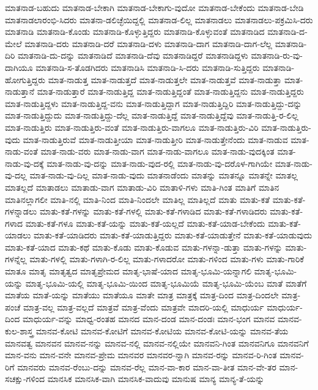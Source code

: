 {ಮಾತನಾಡ-ಬಹುದು
ಮಾತನಾಡ-ಬೇಕಾಗಿ
ಮಾತನಾಡ-ಬೇಕಾಗು-ವುದೋ
ಮಾತನಾಡ-ಬೇಕೆಂದು
ಮಾತನಾಡ-ಬೇಡಿ
ಮಾತನಾಡಲಾರಂಭಿ-ಸಿದರು
ಮಾತನಾ-ಡಲಿಚ್ಛೆಯಿದ್ದಲ್ಲಿ
ಮಾತನಾಡ-ಲಿಲ್ಲ
ಮಾತನಾಡಲು
ಮಾತನಾಡಲು-ಪಕ್ರಮಿಸಿ-ದರು
ಮಾತನಾಡಿ
ಮಾತನಾಡಿ-ಕೊಂಡು
ಮಾತನಾಡಿ-ಕೊಳ್ಳುತ್ತಿದ್ದರು
ಮಾತನಾಡಿ-ಕೊಳ್ಳುವಂತೆ
ಮಾತನಾಡಿದ
ಮಾತನಾಡಿ-ದ-ಮೇಲೆ
ಮಾತನಾಡಿ-ದರು
ಮಾತನಾಡಿ-ದರೆ
ಮಾತನಾಡಿ-ದಳು
ಮಾತನಾಡಿ-ದಾಗ
ಮಾತನಾಡಿ-ದಾಗ-ಲೆಲ್ಲ
ಮಾತನಾಡಿ-ದಿರಿ
ಮಾತನಾಡಿ-ದು-ದನ್ನು
ಮಾತನಾಡಿದೆ
ಮಾತನಾಡಿ-ದೆವು
ಮಾತನಾಡಿದ್ದರೆ
ಮಾತನಾಡಿದ್ದಳು
ಮಾತನಾಡಿ-ರು-ವು-ದಾಗಿಯೂ
ಮಾತನಾಡಿ-ಸ-ತೊಡಗಿದರು
ಮಾತನಾಡಿಸಿ
ಮಾತನಾಡಿ-ಸಿ-ದರು
ಮಾತನಾಡಿ-ಸುತ್ತಿದ್ದರು
ಮಾತನಾಡಿ-ಹೋಗುತ್ತಿದ್ದರು
ಮಾತ-ನಾಡುತ್ತ
ಮಾತ-ನಾಡುತ್ತದೆ
ಮಾತ-ನಾಡುತ್ತಲೇ
ಮಾತ-ನಾಡುತ್ತವೆ
ಮಾತ-ನಾಡುತ್ತಾ
ಮಾತ-ನಾಡುತ್ತಾನೆ
ಮಾತ-ನಾಡುತ್ತಾರೆ
ಮಾತ-ನಾಡುತ್ತಿದ್ದ
ಮಾತ-ನಾಡುತ್ತಿದ್ದಂತೆ
ಮಾತ-ನಾಡುತ್ತಿದ್ದನು
ಮಾತ-ನಾಡುತ್ತಿದ್ದರು
ಮಾತ-ನಾಡುತ್ತಿದ್ದಳು
ಮಾತ-ನಾಡುತ್ತಿದ್ದ-ವನು
ಮಾತ-ನಾಡುತ್ತಿದ್ದಾಗ
ಮಾತ-ನಾಡುತ್ತಿದ್ದಿರಿ
ಮಾತ-ನಾಡುತ್ತಿದ್ದು-ದನ್ನು
ಮಾತ-ನಾಡುತ್ತಿದ್ದುದು
ಮಾತ-ನಾಡುತ್ತಿದ್ದು-ದೆಲ್ಲ
ಮಾತ-ನಾಡುತ್ತಿದ್ದೆ
ಮಾತ-ನಾಡುತ್ತಿದ್ದೆವು
ಮಾತ-ನಾಡುತ್ತಿ-ರ-ಲಿಲ್ಲ
ಮಾತ-ನಾಡುತ್ತಿರು
ಮಾತ-ನಾಡುತ್ತಿರು-ವಂತೆ
ಮಾತ-ನಾಡುತ್ತಿರು-ವಾಗಲೂ
ಮಾತ-ನಾಡುತ್ತಿರು-ವಿರಿ
ಮಾತ-ನಾಡುತ್ತಿರು-ವುದು
ಮಾತ-ನಾಡುತ್ತಿರುವೆ
ಮಾತ-ನಾಡುತ್ತೀಯಾ
ಮಾತ-ನಾಡುತ್ತೀರಿ
ಮಾತ-ನಾಡುತ್ತೇನೆಂದು
ಮಾತ-ನಾಡುವ
ಮಾತ-ನಾಡು-ವಂತೆ
ಮಾತ-ನಾಡು-ವರು
ಮಾತ-ನಾಡು-ವಾಗ
ಮಾತ-ನಾಡು-ವಾಗಲೂ
ಮಾತ-ನಾಡು-ವುದಕ್ಕಿಂತ
ಮಾತ-ನಾಡು-ವು-ದಕ್ಕೆ
ಮಾತ-ನಾಡು-ವು-ದನ್ನು
ಮಾತ-ನಾಡು-ವುದ-ರಲ್ಲಿ
ಮಾತ-ನಾಡು-ವು-ದರೊಳ-ಗಾಗಿಯೇ
ಮಾತ-ನಾಡು-ವು-ದಲ್ಲ
ಮಾತ-ನಾಡು-ವು-ದಿಲ್ಲ
ಮಾತ-ನಾಡು-ವುದು
ಮಾತನಾಡೆಂದು
ಮಾತನ್ನು
ಮಾತನ್ನೂ
ಮಾತನ್ನೇ
ಮಾತಲ್ಲ
ಮಾತಲ್ಲದೆ
ಮಾತಾಡಲು
ಮಾತಾಡು-ವಾಗ
ಮಾತಾಡು-ವಿರಿ
ಮಾತಾಳಿ-ಗಳು
ಮಾತಿ-ಗಿಂತ
ಮಾತಿಗೆ
ಮಾತಿನ
ಮಾತಿನಲ್ಲಾಗಲೀ
ಮಾತಿ-ನಲ್ಲಿ
ಮಾತಿ-ನಿಂದ
ಮಾತಿ-ನಿಂದಲೇ
ಮಾತಿಲ್ಲ
ಮಾತಿಲ್ಲದೆ
ಮಾತು
ಮಾತು-ಕತೆ
ಮಾತು-ಕತೆ-ಗಳನ್ನಾಡಲು
ಮಾತು-ಕತೆ-ಗಳನ್ನು
ಮಾತು-ಕತೆ-ಗಳಲ್ಲಿ
ಮಾತು-ಕತೆ-ಗಳಾಡಿದ
ಮಾತು-ಕತೆ-ಗಳಾಡಿದರು
ಮಾತು-ಕತೆ-ಗಳಾದ
ಮಾತು-ಕತೆ-ಗಳೂ
ಮಾತು-ಕತೆ-ಯನ್ನು
ಮಾತು-ಕತೆ-ಯಲ್ಲದೆ
ಮಾತು-ಕತೆ-ಯಾಡ-ಬೇಕೆಂದು
ಮಾತು-ಕತೆ-ಯಾಡಲು
ಮಾತು-ಕತೆ-ಯಾಡಿದರು
ಮಾತು-ಕತೆ-ಯಾಡುತ್ತಿದ್ದರು
ಮಾತು-ಕತೆ-ಯಾಡುತ್ತೇನೆ
ಮಾತು-ಕತೆ-ಯಾಡುವುದು
ಮಾತು-ಕತೆ-ಯಾದ
ಮಾತು-ಕಥೆ
ಮಾತು-ಕೊಡು
ಮಾತು-ಕೊಡುವ
ಮಾತು-ಗಳನ್ನಾ-ಡುತ್ತಾ
ಮಾತು-ಗಳನ್ನು
ಮಾತು-ಗಳನ್ನೆಲ್ಲ
ಮಾತು-ಗಳಲ್ಲಿ
ಮಾತು-ಗಳಾಗಿ-ರ-ಲಿಲ್ಲ
ಮಾತು-ಗಳಾದರೋ
ಮಾತು-ಗಳಿಂದ
ಮಾತು-ಗಳು
ಮಾತು-ಗಾರಿಕೆ
ಮಾತೂ
ಮಾತೃ
ಮಾತೃತ್ವದ
ಮಾತೃಪ್ರೇಮದ
ಮಾತೃ-ಭಾಷೆ-ಯಾದ
ಮಾತೃ-ಭೂಮಿ-ಯನ್ನಾಗಲಿ
ಮಾತೃ-ಭೂಮಿ-ಯನ್ನು
ಮಾತೃ-ಭೂಮಿ-ಯಲ್ಲಿ
ಮಾತೃ-ಭೂಮಿ-ಯಿಂದ
ಮಾತೃ-ಭೂಮಿಯೆ
ಮಾತೃ-ಭೂಮಿ-ಯೆಂಬ
ಮಾತೆ
ಮಾತೆಗೆ
ಮಾತೆಯ
ಮಾತೆ-ಯನ್ನು
ಮಾತೆಯು
ಮಾತೆಯೂ
ಮಾತೇ
ಮಾತ್ರ
ಮಾತ್ರಕ್ಕೆ
ಮಾತ್ರ-ದಿಂದ
ಮಾತ್ರ-ದಿಂದಲೇ
ಮಾತ್ರ-ಪಂಚೆ
ಮಾತ್ರ-ವಲ್ಲ
ಮಾತ್ರ-ವಲ್ಲದೆ
ಮಾತ್ರವೆ
ಮಾತ್ರ-ವೆಂದು
ಮಾತ್ರವೇ
ಮಾದರಿ-ಯಲ್ಲಿ
ಮಾಧುರ್ಯ
ಮಾಧುರ್ಯ-ದಿಂದ
ಮಾಧುರ್ಯ-ವನ್ನು
ಮಾಧ್ವ-ರಂತಹ
ಮಾನದ
ಮಾನ-ದಂಡ
ಮಾನ-ದಂಡಃ
ಮಾನ-ಭಂಗ
ಮಾನವ
ಮಾನವ-ಕುಲ-ಶಾಸ್ತ್ರ
ಮಾನವ-ಕೋಟಿ
ಮಾನವ-ಕೋಟಿಗೆ
ಮಾನವ-ಕೋಟಿಯ
ಮಾನವ-ಕೋಟಿ-ಯನ್ನು
ಮಾನವ-ತೆಯ
ಮಾನವತ್ವ
ಮಾನವನ
ಮಾನವ-ನನ್ನು
ಮಾನವ-ನಲ್ಲಿ
ಮಾನವ-ನಲ್ಲಿಯೇ
ಮಾನವನಿ-ಗಿಂತ
ಮಾನವನಿಗೂ
ಮಾನವನಿಗೆ
ಮಾನ-ವನು
ಮಾನ-ವನೇ
ಮಾನವ-ಪ್ರೇಮ
ಮಾನವರ
ಮಾನವರ-ನ್ನಾಗಿ
ಮಾನವ-ರನ್ನು
ಮಾನವ-ರಿ-ಗಿಂತ
ಮಾನವ-ರಿಗೆ
ಮಾನವರು
ಮಾನವ-ರೆಂಬು-ದನ್ನು
ಮಾನವ-ರೆಲ್ಲ
ಮಾನ-ವಾ-ಕಾರ
ಮಾನ-ವಾ-ತೀತ
ಮಾನ-ವೇ-ತರ
ಮಾನ-ಸಚಕ್ಷು-ಗಳಿಂದ
ಮಾನಸಿಕ
ಮಾನಸಿಕ-ವಾಗಿ
ಮಾನಸಿಕ-ವಾದುವು
ಮಾನುಷ
ಮಾನ್ಯ
ಮಾನ್ಯ-ತೆ-ಯನ್ನು
}
